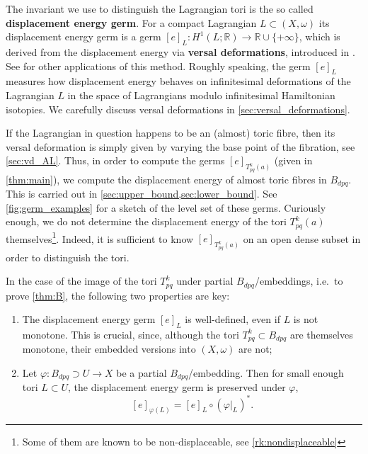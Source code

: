 \documentclass[12pt,a4paper,abstract=true,final]{scrartcl}
\begin{document}
\medskip

The invariant we use to distinguish the Lagrangian tori is the so called \textbf{displacement energy germ}.
For a compact Lagrangian $L \subset (X,\omega)$ its displacement energy germ is a germ $[e]_L \colon H^1(L;\mathbb{R}) \rightarrow \mathbb{R} \cup \{+\infty\}$, which is derived from  the displacement energy via \textbf{versal deformations}, introduced in \cite{Che96}. See \cite{brendel2020real,brendel2023local,CheSch10} for other applications of this method.
Roughly speaking, the germ $[e]_L$ measures how displacement energy behaves on infinitesimal deformations of the Lagrangian $L$ in the space of Lagrangians modulo infinitesimal Hamiltonian isotopies.
We carefully discuss versal deformations in \cref{sec:versal_deformations}. 

If the Lagrangian in question happens to be an (almost) toric fibre, then its versal deformation is simply given by varying the base point of the fibration, see \cref{sec:vd_AL}. Thus, in order to compute the germs $[e]_{T^k_{pq}(a)}$ (given in \cref{thm:main}), we compute the displacement energy of almost toric fibres in $B_{dpq}$. This is carried out in \cref{sec:upper_bound,sec:lower_bound}. See \cref{fig:germ_examples} for a sketch of the level set of these germs. Curiously enough, we do not determine the displacement energy of the tori $T^{k}_{pq}(a)$ themselves\footnote{Some of them are known to be non-displaceable, see \cref{rk:nondisplaceable}}. Indeed, it is sufficient to know $[e]_{T^k_{pq}(a)}$ on an open dense subset in order to distinguish the tori. 

In the case of the image of the tori $T^k_{pq}$ under partial $B_{dpq}$\-/embeddings, i.e.\ to prove \cref{thm:B}, the following two properties are key:

\begin{enumerate}
    \item The displacement energy germ $[e]_L$ is well-defined, even if $L$ is not monotone.
This is crucial, since, although the tori $T^k_{pq} \subset B_{dpq}$ are themselves monotone, their embedded versions into $(X,\omega)$ are not; 
    \item Let $\varphi \colon B_{dpq} \supset U \rightarrow X$ be a partial $B_{dpq}$\-/embedding.
Then for small enough tori $L \subset U$, the displacement energy germ is preserved under $\varphi$, 
    \begin{equation}
        \label{eq:locality}
        [e]_{\varphi(L)} = [e]_L \circ (\varphi\vert_L)^*.
    \end{equation}
\end{enumerate}
\end{document}
